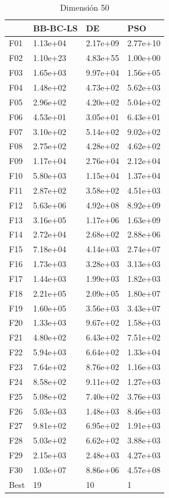 \begin{table}[H]
    \begin{minipage}{.5\linewidth}
      \caption{Dimensión 50}
      \centering
      \begin{tabular}{llll}
        \toprule
        {} &  BB-BC-LS &        DE &       PSO \\
        \midrule
        F01  &  1.13e+04 &  2.17e+09 &  2.77e+10 \\
        F02  &  1.10e+23 &  4.83e+55 &  1.00e+00 \\
        F03  &  1.65e+03 &  9.97e+04 &  1.56e+05 \\
        F04  &  1.48e+02 &  4.73e+02 &  5.62e+03 \\
        F05  &  2.96e+02 &  4.20e+02 &  5.04e+02 \\
        F06  &  4.53e+01 &  3.05e+01 &  6.43e+01 \\
        F07  &  3.10e+02 &  5.14e+02 &  9.02e+02 \\
        F08  &  2.75e+02 &  4.28e+02 &  4.62e+02 \\
        F09  &  1.17e+04 &  2.76e+04 &  2.12e+04 \\
        F10  &  5.80e+03 &  1.15e+04 &  1.37e+04 \\
        F11  &  2.87e+02 &  3.58e+02 &  4.51e+03 \\
        F12  &  5.63e+06 &  4.92e+08 &  8.92e+09 \\
        F13  &  3.16e+05 &  1.17e+06 &  1.63e+09 \\
        F14  &  2.72e+04 &  2.68e+02 &  2.88e+06 \\
        F15  &  7.18e+04 &  4.14e+03 &  2.74e+07 \\
        F16  &  1.73e+03 &  3.28e+03 &  3.13e+03 \\
        F17  &  1.44e+03 &  1.99e+03 &  1.82e+03 \\
        F18  &  2.21e+05 &  2.09e+05 &  1.80e+07 \\
        F19  &  1.60e+05 &  3.56e+03 &  3.43e+07 \\
        F20  &  1.33e+03 &  9.67e+02 &  1.58e+03 \\
        F21  &  4.80e+02 &  6.43e+02 &  7.51e+02 \\
        F22  &  5.94e+03 &  6.64e+02 &  1.33e+04 \\
        F23  &  7.64e+02 &  8.76e+02 &  1.16e+03 \\
        F24  &  8.58e+02 &  9.11e+02 &  1.27e+03 \\
        F25  &  5.08e+02 &  7.40e+02 &  3.76e+03 \\
        F26  &  5.03e+03 &  1.48e+03 &  8.46e+03 \\
        F27  &  9.81e+02 &  6.95e+02 &  1.91e+03 \\
        F28  &  5.03e+02 &  6.62e+02 &  3.88e+03 \\
        F29  &  2.15e+03 &  2.48e+03 &  4.27e+03 \\
        F30  &  1.03e+07 &  8.86e+06 &  4.57e+08 \\
        Best &        19 &        10 &         1 \\
        \bottomrule
        \end{tabular}
        

\end{minipage}
\end{table}
